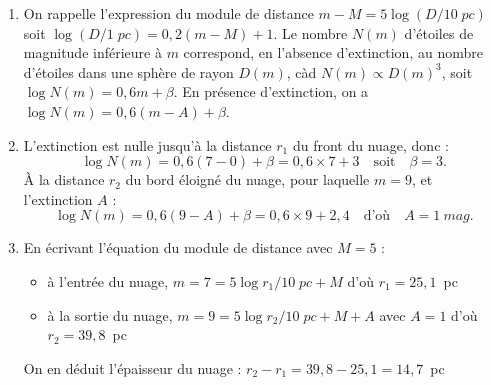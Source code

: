 \documentclass[a4paper,10pt]{report}
\renewcommand{\u}[1]{\si{#1}} %
\begin{document}
\begin{Answer}
  \begin{enumerate}
  \item On rappelle l'expression du module de distance $m-M =
    5\log(D/10\;\u{pc})$ soit $\log(D/1\;\u{pc}) = 0,2(m-M)+1$. Le
    nombre $N(m)$ d'étoiles de magnitude inférieure à $m$ correspond,
    en l'absence d'extinction, au nombre d'étoiles dans une sphère de
    rayon $D(m)$, càd $N(m) \propto D(m)^3$, soit $\log N(m) = 0,6 m +
    \beta$.  En présence d'extinction, on a $\log N(m) = 0,6(m-A) +
    \beta$.
  \item L'extinction est nulle jusqu'à la distance $r_1$ du front du
    nuage, donc :
    $$
    \log{N(m)} = 0,6 (7-0) + \beta = 0,6\times 7 + 3
    \quad\text{soit}\quad \beta=3.
    $$
    À la distance $r_2$ du bord éloigné du nuage, pour laquelle $m =
    9$, et l'extinction $A$ :
    $$
    \log{N(m)} = 0,6 (9-A) + \beta = 0,6\times 9 + 2,4
    \quad\text{d'où}\quad A = 1~\u{mag}.
    $$
  \item En écrivant l'équation du module de distance avec $M=5$ :
    \begin{itemize}
    \item à l'entrée du nuage, $m = 7 = 5\log{r_1/10\;\u{pc}}+M$ d'où
      $r_1 = 25,1$~pc
    \item à la sortie du nuage, $m = 9 = 5\log{r_2/10\;\u{pc}}+M+A$
      avec $A=1$ d'où $r_{2} = 39,8$~pc
    \end{itemize}
    On en déduit l'épaisseur du nuage : $r_2-r_1 = 39,8-25,1 = 14,7$~pc
  \end{enumerate}
\end{Answer}
\end{document}
